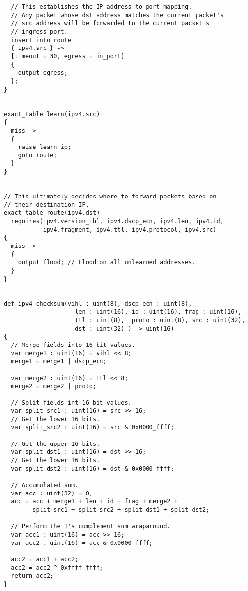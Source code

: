\begin{lstlisting}
  // This establishes the IP address to port mapping.
  // Any packet whose dst address matches the current packet's
  // src address will be forwarded to the current packet's
  // ingress port.
  insert into route
  { ipv4.src } ->
  [timeout = 30, egress = in_port]
  {
    output egress;
  };
}


exact_table learn(ipv4.src)
{
  miss ->
  {
    raise learn_ip;
    goto route;
  }
}


// This ultimately decides where to forward packets based on
// their destination IP.
exact_table route(ipv4.dst)
  requires(ipv4.version_ihl, ipv4.dscp_ecn, ipv4.len, ipv4.id,
           ipv4.fragment, ipv4.ttl, ipv4.protocol, ipv4.src)
{
  miss ->
  {
    output flood; // Flood on all unlearned addresses.
  }
}


def ipv4_checksum(vihl : uint(8), dscp_ecn : uint(8), 
					len : uint(16),	id : uint(16), frag : uint(16), 
					ttl : uint(8),  proto : uint(8), src : uint(32), 
					dst : uint(32) ) -> uint(16)
{
  // Merge fields into 16-bit values.
  var merge1 : uint(16) = vihl << 8;
  merge1 = merge1 | dscp_ecn;

  var merge2 : uint(16) = ttl << 8;
  merge2 = merge2 | proto;

  // Split fields int 16-bit values.
  var split_src1 : uint(16) = src >> 16;
  // Get the lower 16 bits.
  var split_src2 : uint(16) = src & 0x0000_ffff;

  // Get the upper 16 bits.
  var split_dst1 : uint(16) = dst >> 16;
  // Get the lower 16 bits.
  var split_dst2 : uint(16) = dst & 0x0000_ffff;

  // Accumulated sum.
  var acc : uint(32) = 0;
  acc = acc + merge1 + len + id + frag + merge2 +
        split_src1 + split_src2 + split_dst1 + split_dst2;

  // Perform the 1's complement sum wraparound.
  var acc1 : uint(16) = acc >> 16;
  var acc2 : uint(16) = acc & 0x0000_ffff;

  acc2 = acc1 + acc2;
  acc2 = acc2 ^ 0xffff_ffff;
  return acc2;
}
\end{lstlisting}


